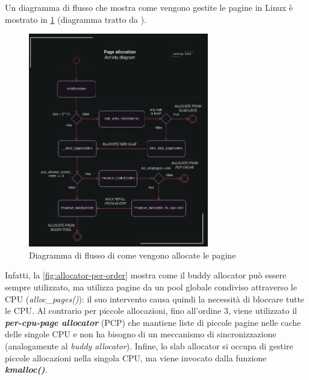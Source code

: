 \documentclass{article}
\begin{document}
Un diagramma di flusso che mostra come vengono gestite le pagine in Linux è mostrato 
in \cref{fig:flowchart-page-allocator} 
(diagramma tratto da \cite{NetfilterTablesVulnerability}).

\begin{figure}[h]
  \begin{center}
    \includegraphics[width=0.7\textwidth]{figures/ch1/activity-diagram-allocator.png}
  \end{center}
  \caption{Diagramma di flusso di come vengono allocate le pagine}\label{fig:flowchart-page-allocator}
\end{figure}


Infatti, la \cref{fig:allocator-per-order}\cite{NetfilterTablesVulnerability}
mostra come il buddy allocator può essere sempre utilizzato, ma utilizza pagine da un pool globale 
condiviso attraverso le CPU (\textit{alloc\_pages()}): il suo intervento causa quindi la 
necessità di bloccare tutte le CPU. Al contrario per piccole allocazioni, fino all'ordine 
$3$, viene utilizzato il \textbf{\textit{per-cpu-page allocator}} (PCP) che mantiene liste 
di piccole pagine nelle cache delle singole CPU e non ha bisogno di un meccanismo di sincronizzazione 
(analogamente al \textit{buddy allocator}). Infine, lo slab allocator si occupa di 
gestire piccole allocazioni nella singola CPU, ma viene invocato dalla funzione 
\textbf{\textit{kmalloc()}}.
\end{document}
